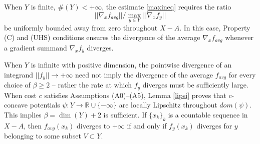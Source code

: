 \documentclass[12pt]{amsart}
\newtheorem{lem}{Lemma}
\theoremstyle{definition}
\theoremstyle{remark}
\newcommand{\bR}{\mathbb{R}}
\begin{document}
When $Y$ is finite, $\#(Y)<+\infty$, the estimate \eqref{maxineq} requires the ratio $$||\nabla_x f_{avg}||/ \max_{y\in Y}||\nabla_x f_y||$$ be uniformly bounded away from zero throughout $X-A$. In this case, Property (C) and (UHS) conditions ensures the divergence of the average $\nabla_x f_{avg}$ whenever a gradient summand $\nabla_x f_y$ diverges. 

When $Y$ is infinite with positive dimension, the pointwise divergence of an integrand $||f_y||\to +\infty$ need not imply the divergence of the average $f_{avg}$ for every choice of $\beta\geq 2$ -- rather the rate at which $f_y$ diverges must be sufficiently large. When cost $c$ satisfies Assumptions (A0)--(A5), Lemma \ref{lipsi} proves that $c$-concave potentials $\psi: Y\to \bR \cup \{-\infty\}$ are locally Lipschitz throughout $dom(\psi)$. This implies $\beta =\dim(Y)+2$ is sufficient. If $\{x_k\}_k$ is a countable sequence in $X-A$, then $f_{avg}(x_k)$ diverges to $+\infty$ if and only if $f_y(x_k)$ diverges for $y$ belonging to some subset $V\subset Y$. 













\end{document}
